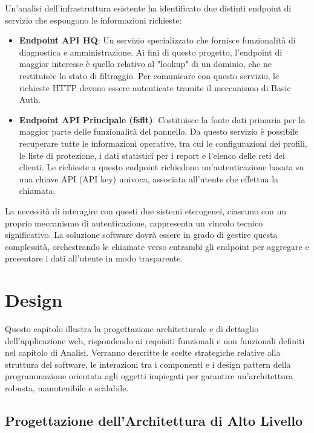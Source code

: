 \documentclass[12pt,a4paper,openright,twoside]{book}
\begin{document}
Un'analisi dell'infrastruttura esistente ha identificato due distinti endpoint di servizio che espongono le informazioni richieste:
\begin{itemize}
    \item \textbf{Endpoint API HQ}: Un servizio specializzato che fornisce funzionalità di diagnostica e amministrazione. Ai fini di questo progetto, l'endpoint di maggior interesse è quello relativo al "lookup" di un dominio, che ne restituisce lo stato di filtraggio. Per comunicare con questo servizio, le richieste HTTP devono essere autenticate tramite il meccanismo di Basic Auth.

    \item \textbf{Endpoint API Principale (fsflt)}: Costituisce la fonte dati primaria per la maggior parte delle funzionalità del pannello. Da questo servizio è possibile recuperare tutte le informazioni operative, tra cui le configurazioni dei profili, le liste di protezione, i dati statistici per i report e l'elenco delle reti dei clienti. Le richieste a questo endpoint richiedono un'autenticazione basata su una chiave API (API key) univoca, associata all'utente che effettua la chiamata.
\end{itemize}
La necessità di interagire con questi due sistemi eterogenei, ciascuno con un proprio meccanismo di autenticazione, rappresenta un vincolo tecnico significativo. La soluzione software dovrà essere in grado di gestire questa complessità, orchestrando le chiamate verso entrambi gli endpoint per aggregare e presentare i dati all'utente in modo trasparente.
\chapter{Design}
\label{chap:design}

Questo capitolo illustra la progettazione architetturale e di dettaglio dell'applicazione web, rispondendo ai requisiti funzionali e non funzionali definiti nel capitolo di Analisi. Verranno descritte le scelte strategiche relative alla struttura del software, le interazioni tra i componenti e i design pattern della programmazione orientata agli oggetti impiegati per garantire un'architettura robusta, manutenibile e scalabile.

\section{Progettazione dell'Architettura di Alto Livello}
\label{sec:design_architettura}
\end{document}
